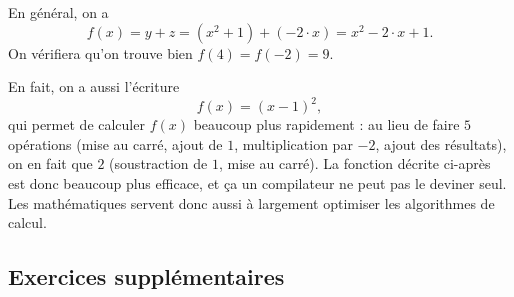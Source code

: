 \documentclass[a4paper, 14pt]{extarticle}
\theoremstyle{plain}
\theoremstyle{definition}
\begin{document}
{		En général, on a 
			\[ f(x) = y + z = (x^2 + 1) + (-2\cdot x) = x^2 - 2\cdot x + 1. \]
		On vérifiera qu'on trouve bien $f(4) = f(-2) = 9$.
		
		En fait, on a aussi l'écriture 
			\[ f(x) = (x-1)^2, \]
		qui permet de calculer $f(x)$ beaucoup plus rapidement : au lieu de faire $5$ opérations (mise au carré, ajout de $1$, multiplication par $-2$, ajout des résultats), on en fait que $2$ (soustraction de $1$, mise au carré).
		La fonction décrite ci-après est donc beaucoup plus efficace, et ça un compilateur ne peut pas le deviner seul.
		Les mathématiques servent donc aussi à largement optimiser les algorithmes de calcul.
	}
	
\else
\newpage
\fi
\subsection*{Exercices supplémentaires}
\end{document}
